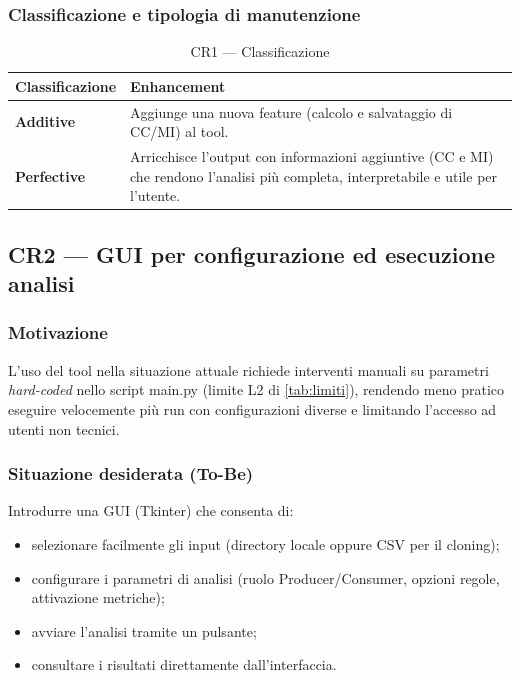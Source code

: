 \documentclass[11pt,a4paper]{article}
\makeatletter
\newif\ifmark@prevlower
\def\mark@casebreak#1{%
  \ifcat\noexpand#1\relax
    \mark@prevlowerfalse
  \else
    \ifnum`#1=\uccode`#1\relax
      \ifmark@prevlower\allowbreak\fi
      \mark@prevlowerfalse
    \else
      \ifnum`#1=\lccode`#1\relax
        \mark@prevlowertrue
      \else
        \mark@prevlowerfalse
      \fi
    \fi
  \fi}
\def\mark@brk#1{%
  \ifx#1\mark@stop
    \let\mark@next\relax
  \else
    \mark@casebreak{#1}%
    #1%
    \ifx#1.\allowbreak\else
      \ifx#1\_\allowbreak\else
        \ifx#1/\allowbreak\else
          \ifx#1(\allowbreak\fi
        \fi
      \fi
    \fi
    \let\mark@next\mark@brk
  \fi
  \mark@next}
\def\mark@stop{\mark@stop}
\DeclareRobustCommand{\mark@code}[1]{%
  \ifmmode
    \text{\ttfamily\small\mark@prevlowerfalse\mark@brk#1\mark@stop}%
  \else
    {\ttfamily\small\mark@prevlowerfalse\mark@brk#1\mark@stop}%
  \fi}
\DeclareRobustCommand{\file}[1]{\mark@code{#1}}
\def\mark@code#1{#1}%
\def\file#1{#1}%
\newcommand{\thead}[1]{\textbf{#1}}
\makeatother
\begin{document}
\subsubsection*{Classificazione e tipologia di manutenzione}

\begin{table}[H]
  \centering\small
  \caption{CR1 --- Classificazione}
  \label{tab:cr1-class}
  \begin{tabularx}{\linewidth}{@{}L{3.3cm} Y@{}}
    \toprule
    \thead{Classificazione} & \textbf{Enhancement}\\
    \midrule
    \thead{Additive} & Aggiunge una nuova feature (calcolo e salvataggio di
      CC/MI) al tool.\\
    \midrule
    \thead{Perfective} & Arricchisce l'output con informazioni aggiuntive (CC e
      MI) che rendono l'analisi pi\`u completa, interpretabile e utile per
      l'utente.\\
    \bottomrule
  \end{tabularx}
\end{table}

\subsection{CR2 --- GUI per configurazione ed esecuzione analisi}
\label{sec:cr2}

\subsubsection*{Motivazione}

L'uso del tool nella situazione attuale richiede interventi manuali su parametri
\emph{hard-coded} nello script \file{main.py} (limite L2 di \cref{tab:limiti}),
rendendo meno pratico eseguire velocemente pi\`u run con configurazioni diverse
e limitando l'accesso ad utenti non tecnici.

\subsubsection*{Situazione desiderata (To-Be)}

Introdurre una GUI (Tkinter) che consenta di:

\begin{itemize}[nosep]
  \item selezionare facilmente gli input (directory locale oppure CSV per il
    cloning);
  \item configurare i parametri di analisi (ruolo Producer/Consumer, opzioni
    regole, attivazione metriche);
  \item avviare l'analisi tramite un pulsante;
  \item consultare i risultati direttamente dall'interfaccia.
\end{itemize}
\end{document}
